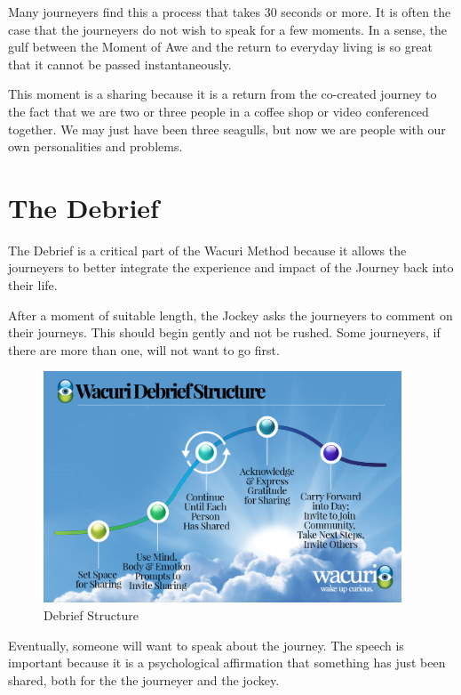 \documentclass[12pt]{book}
\begin{document}
Many journeyers find this a process that takes 30 seconds or more. It is often the case that the journeyers do not wish to speak for a few moments. In a sense, the gulf between the Moment of Awe and the return to everyday living is so great that it cannot be passed instantaneously.
					
This moment is a sharing because it is a return from the co-created journey to the fact that we are two or three people in a coffee shop or video conferenced together. We may just have been three seagulls, but now we are people with our own personalities and problems.
				
			
		




\chapter{The Debrief}

The Debrief is a critical part of the Wacuri Method because it allows the journeyers to better integrate the experience and impact of the Journey back into their life.
					
After a moment of suitable length, the Jockey asks the journeyers to comment on their journeys. This should begin gently and not be rushed. Some journeyers, if there are more than one, will not want to go first.

\begin{figure}
  \centering
     \includegraphics[width=0.95\textwidth]{WacuriFigures/Wacuri-Debrief-Structure.png}
     \caption{Debrief Structure}
  \label{fig:debrief}     
\end{figure}

Eventually, someone will want to speak about the journey. The speech is important because it is a psychological affirmation that something has just been shared, both for the the journeyer and the jockey.
					
\end{document}
